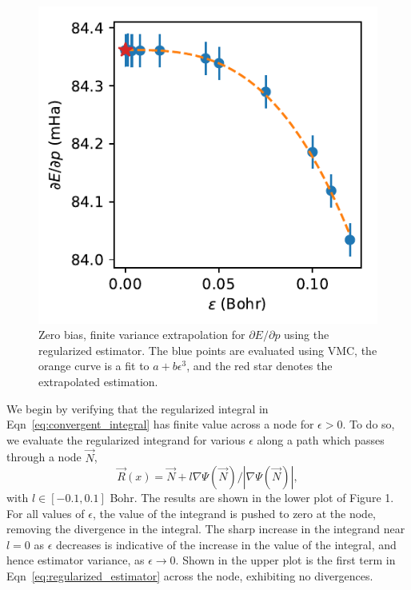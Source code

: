 \documentclass[twocolumn]{revtex4-1}
\begin{document}
\begin{figure}
\includegraphics{../2_plots/dedp.pdf}
\caption{Zero bias, finite variance extrapolation for $\partial E/\partial p$ using the regularized estimator. The blue points are evaluated using VMC, the orange curve is a fit to $a + b\epsilon^3$, and the red star denotes the extrapolated estimation. }
\end{figure}

We begin by verifying that the regularized integral in Eqn~\ref{eq:convergent_integral} has finite value across a node for $\epsilon > 0$. 
To do so, we evaluate the regularized integrand for various $\epsilon$ along a path which passes through a node $\vec{N}$, 
\begin{equation}
   \vec{R}(x) = \vec{N} + l \nabla \Psi(\vec{N})/|\nabla \Psi(\vec{N})|,
\end{equation}
 with $l \in [-0.1, 0.1]$ Bohr.
The results are shown in the lower plot of Figure 1.
For all values of $\epsilon$, the value of the integrand is pushed to zero at the node, removing the divergence in the integral.
The sharp increase in the integrand near $l=0$ as $\epsilon$ decreases is indicative of the increase in the value of the integral, and hence estimator variance, as $\epsilon \rightarrow 0$.
Shown in the upper plot is the first term in Eqn~\ref{eq:regularized_estimator} across the node, exhibiting no divergences.
\end{document}
